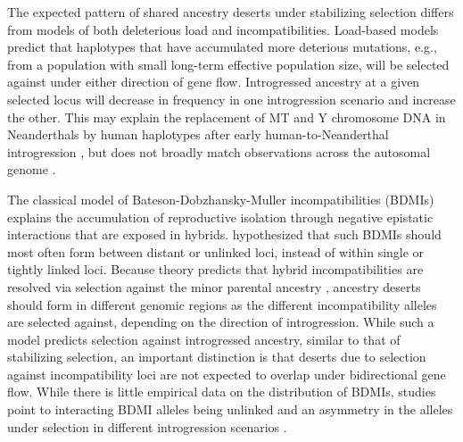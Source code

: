 \documentclass{article}
\begin{document}
The expected pattern of shared ancestry deserts under stabilizing selection
differs from models of both deleterious load and incompatibilities. Load-based
models predict that haplotypes that have accumulated more deterious mutations,
e.g., from a population with small long-term effective population size, will be
selected against under either direction of gene flow. Introgressed ancestry at
a given selected locus will decrease in frequency in one introgression scenario
and increase the other. This may explain the replacement of MT and Y chromosome
DNA in Neanderthals by human haplotypes after early human-to-Neanderthal
introgression \citep{posth2017deeply, petr2020evolutionary}, but does not broadly
match observations across the autosomal genome \citep{harris2023diverse}.

The classical model of Bateson-Dobzhansky-Muller incompatibilities (BDMIs)
\citep{bateson1909heredity, dobzhansky1936studies, muller1942isolating}
explains the accumulation of reproductive isolation through negative epistatic
interactions that are exposed in hybrids. \citet{muller1942isolating}
hypothesized that such BDMIs should most often form between distant or unlinked
loci, instead of within single or tightly linked loci. Because theory predicts
that hybrid incompatibilities are resolved via selection against the minor
parental ancestry \citep{moran2021genomic}, ancestry deserts should form in
different genomic regions as the different incompatibility alleles are selected
against, depending on the direction of introgression. While such a model
predicts selection against introgressed ancestry, similar to that of
stabilizing selection, an important distinction is that deserts due to
selection against incompatibility loci are not expected to overlap under
bidirectional gene flow. While there is little empirical data on the
distribution of BDMIs, studies point to interacting BDMI alleles being unlinked
\citep[e.g.,][]{presgraves2003fine} and an asymmetry in the alleles under
selection in different introgression scenarios \citep{maheshwari2011genetics,
moran2021genomic}.
\end{document}
